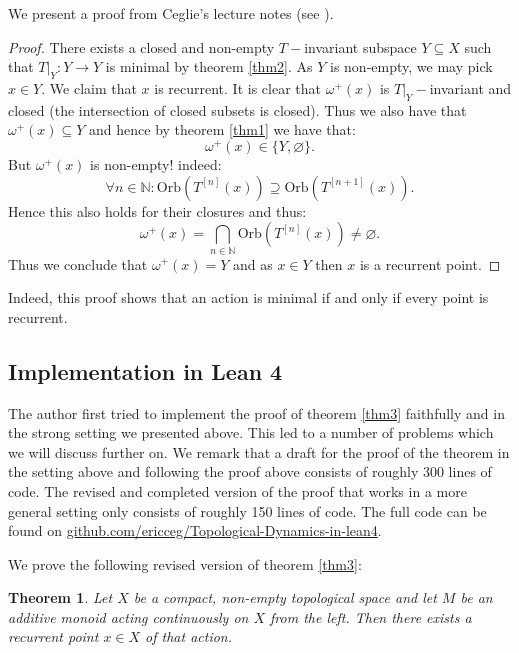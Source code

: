 \documentclass[11pt]{article}
\newtheorem{theorem}{Theorem}
\theoremstyle{definition}              %
\theoremstyle{definition}              %
\theoremstyle{definition}              %
\begin{document}
We present a proof from Ceglie's lecture notes (see \citep[Cor.~1.16,p.~13]{ceglie}).

\begin{proof}
    There exists a closed and non-empty $T-$invariant subspace $Y \subseteq X$ such that $T|_Y:Y \to Y$ is minimal by theorem \ref{thm2}. As $Y$ is non-empty, we may pick $x \in Y$. We claim that $x$ is recurrent. It is clear that $\omega^+(x)$ is $T|_Y-$invariant and closed (the intersection of closed subsets is closed). Thus we also have that $\omega^+(x) \subseteq Y$ and hence by theorem \ref{thm1} we have that:
    \begin{equation}
        \omega^+(x) \in \{Y,\varnothing\}.
    \end{equation}
    But $\omega^+(x)$ is non-empty! indeed:
    \begin{equation}
        \forall n \in \mathbb{N}: \text{Orb}(T^{[n]}(x)) \supseteq \text{Orb}(T^{[n+1]}(x)).
    \end{equation}
    Hence this also holds for their closures and thus:
    \begin{equation}
        \omega^+(x)=\bigcap_{n \in \mathbb{N}}\text{Orb}(T^{[n]}(x)) \neq \varnothing.
    \end{equation}
    Thus we conclude that $\omega^+(x)=Y$ and as $x \in Y$ then $x$ is a recurrent point.
\end{proof}

Indeed, this proof shows that an action is minimal if and only if every point is recurrent.

\subsection{Implementation in Lean 4}
The author first tried to implement the proof of theorem \ref{thm3} faithfully and in the strong setting we presented above. This led to a number of problems which we will discuss further on. We remark that a draft for the proof of the theorem in the setting above and following the proof above consists of roughly 300 lines of code. The revised and completed version of the proof that works in a more general setting only consists of roughly 150 lines of code. The full code can be found on \href{https://github.com/ericceg/Topological-Dynamics-in-lean4/blob/master/Project/Corollary.lean}{github.com/ericceg/Topological-Dynamics-in-lean4}.

We prove the following revised version of theorem \ref{thm3}:

\begin{theorem}
    Let $X$ be a compact, non-empty topological space and let $M$ be an additive monoid acting continuously on $X$ from the left. Then there exists a recurrent point $x \in X$ of that action.
\end{theorem}
\end{document}
